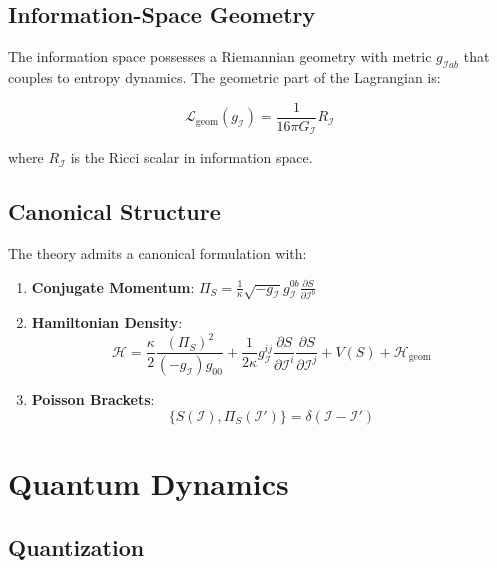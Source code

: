 \documentclass{article}
\begin{document}
\subsection{Information-Space Geometry}

The information space possesses a Riemannian geometry with metric $g_{\mathcal{I}ab}$ that couples to entropy dynamics. The geometric part of the Lagrangian is:

\begin{equation}
\mathcal{L}_{\text{geom}}(g_\mathcal{I}) = \frac{1}{16\pi G_\mathcal{I}}R_\mathcal{I}
\end{equation}

where $R_\mathcal{I}$ is the Ricci scalar in information space.

\subsection{Canonical Structure}

The theory admits a canonical formulation with:

\begin{enumerate}
\item \textbf{Conjugate Momentum}: $\Pi_S = \frac{1}{\kappa}\sqrt{-g_\mathcal{I}} g_\mathcal{I}^{0b}\frac{\partial S}{\partial \mathcal{I}^b}$

\item \textbf{Hamiltonian Density}:
   \begin{equation}
   \mathcal{H} = \frac{\kappa}{2}\frac{(\Pi_S)^2}{(-g_\mathcal{I})g_{00}} + \frac{1}{2\kappa}g_\mathcal{I}^{ij}\frac{\partial S}{\partial \mathcal{I}^i}\frac{\partial S}{\partial \mathcal{I}^j} + V(S) + \mathcal{H}_{\text{geom}}
   \end{equation}

\item \textbf{Poisson Brackets}:
   \begin{equation}
   \{S(\mathcal{I}), \Pi_S(\mathcal{I}')\} = \delta(\mathcal{I} - \mathcal{I}')
   \end{equation}
\end{enumerate}

\section{Quantum Dynamics}

\subsection{Quantization}
\end{document}
